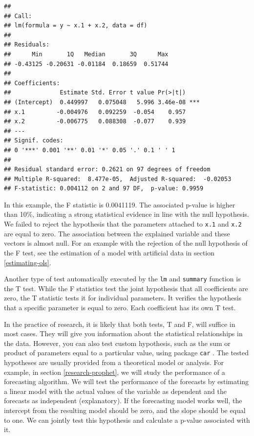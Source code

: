 \documentclass[11pt,]{book}
\begin{document}
\begin{verbatim}
## 
## Call:
## lm(formula = y ~ x.1 + x.2, data = df)
## 
## Residuals:
##      Min       1Q   Median       3Q      Max 
## -0.43125 -0.20631 -0.01184  0.18659  0.51744 
## 
## Coefficients:
##              Estimate Std. Error t value Pr(>|t|)    
## (Intercept)  0.449997   0.075048   5.996 3.46e-08 ***
## x.1         -0.004976   0.092259  -0.054    0.957    
## x.2         -0.006775   0.088308  -0.077    0.939    
## ---
## Signif. codes:  
## 0 '***' 0.001 '**' 0.01 '*' 0.05 '.' 0.1 ' ' 1
## 
## Residual standard error: 0.2621 on 97 degrees of freedom
## Multiple R-squared:  8.477e-05,  Adjusted R-squared:  -0.02053 
## F-statistic: 0.004112 on 2 and 97 DF,  p-value: 0.9959
\end{verbatim}

In this example, the F statistic is 0.0041119. The associated p-value is
higher than 10\%, indicating a strong statistical evidence in line with
the null hypothesis. We failed to reject the hypothesis that the
parameters attached to \texttt{x.1} and \texttt{x.2} are equal to zero.
The association between the explained variable and these vectors is
almost null. For an example with the rejection of the null hypothesis of
the F test, see the estimation of a model with artificial data in
section \ref{estimating-ols}.

Another type of test automatically executed by the \texttt{lm} and
\texttt{summary} function is the T test. While the F statistics test the
joint hypothesis that all coefficients are zero, the T statistic tests
it for individual parameters. It verifies the hypothesis that a specific
parameter is equal to zero. Each coefficient has its own T test.

In the practice of research, it is likely that both tests, T and F, will
suffice in most cases. They will give you information about the
statistical relationships in the data. However, you can also test custom
hypothesis, such as the sum or product of parameters equal to a
particular value, using package \texttt{car} \citep{car}. The tested
hypotheses are usually provided from a theoretical model or analysis.
For example, in section \ref{research-prophet}, we will study the
performance of a forecasting algorithm. We will test the performance of
the forecasts by estimating a linear model with the actual values of the
variable as dependent and the forecasts as independent (explanatory). If
the forecasting model works well, the intercept from the resulting model
should be zero, and the slope should be equal to one. We can jointly
test this hypothesis and calculate a p-value associated with it.
\end{document}
